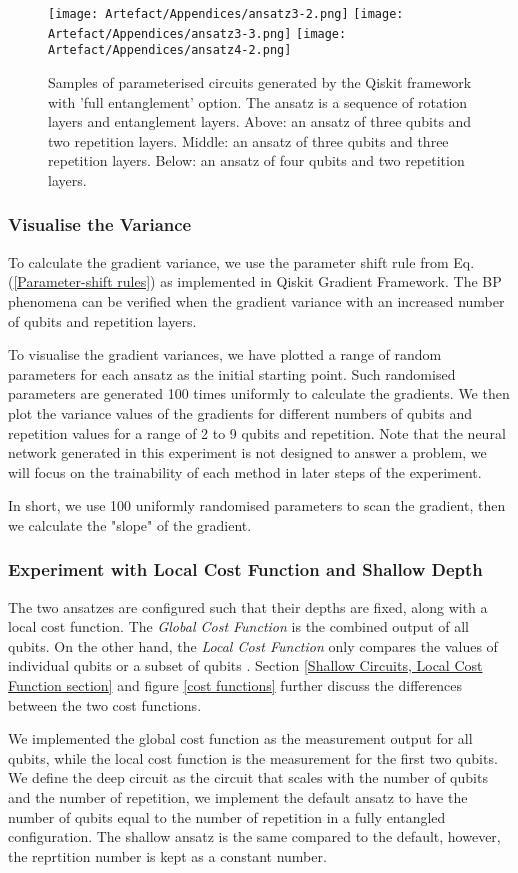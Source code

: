 \begin{figure}
    \texttt{[image: Artefact/Appendices/ansatz3-2.png]}
    \texttt{[image: Artefact/Appendices/ansatz3-3.png]}
    \texttt{[image: Artefact/Appendices/ansatz4-2.png]}
    \caption{
        Samples of parameterised circuits generated by the Qiskit framework with 'full entanglement' option.
        The ansatz is a sequence of rotation layers and entanglement layers.
        Above: an ansatz of three qubits and two repetition layers.
        Middle: an ansatz of three qubits and three repetition layers.
        Below: an ansatz of four qubits and two repetition layers.
    }
    \label{Ansatz samples}
\end{figure}

\subsubsection{Visualise the Variance}
To calculate the gradient variance, we use the parameter shift rule from Eq. (\ref{Parameter-shift rules}) as implemented in Qiskit Gradient Framework.
The BP phenomena can be verified when the gradient variance with an increased number of qubits and repetition layers.

To visualise the gradient variances, we have plotted a range of random parameters for each ansatz as the initial starting point.
Such randomised parameters are generated 100 times uniformly to calculate the gradients.
We then plot the variance values of the gradients for different numbers of qubits and repetition values for a range of 2 to 9 qubits and repetition.
Note that the neural network generated in this experiment is not designed to answer a problem, we will focus on the trainability of each method in later steps of the experiment.

In short, we use 100 uniformly randomised parameters to scan the gradient, then we calculate the "slope" of the gradient.

\subsubsection{Experiment with Local Cost Function and Shallow Depth}
The two ansatzes are configured such that their depths are fixed, along with a local cost function.
The \textit{Global Cost Function} is the combined output of all qubits. 
On the other hand, the \textit{Local Cost Function} only compares the values of individual qubits or a subset of qubits \cite{cerezoCostFunctionDependent2021}.
Section \ref{Shallow Circuits, Local Cost Function section} and figure \ref{cost functions} further discuss the differences between the two cost functions.

We implemented the global cost function as the measurement output for all qubits, while the local cost function is the measurement for the first two qubits.
We define the deep circuit as the circuit that scales with the number of qubits and the number of repetition, we implement the default ansatz to have the number of qubits equal to the number of repetition in a fully entangled configuration. 
The shallow ansatz is the same compared to the default, however, the reprtition number is kept as a constant number.